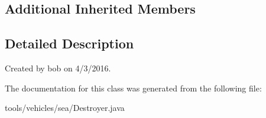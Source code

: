 \subsection*{Additional Inherited Members}


\subsection{Detailed Description}
Created by bob on 4/3/2016. 

The documentation for this class was generated from the following file\+:\begin{DoxyCompactItemize}
\item 
tools/vehicles/sea/Destroyer.\+java\end{DoxyCompactItemize}

